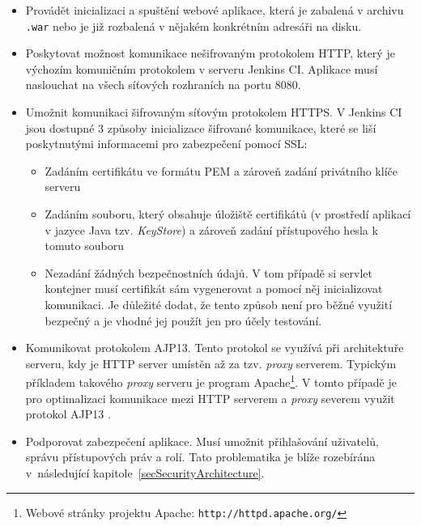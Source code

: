             \begin{itemize}
                \item Provádět inicializaci a spuštění webové aplikace, která je zabalená v archivu \texttt{.war}
                    nebo je již rozbalená v nějakém konkrétním adresáři na disku.
                
                \item Poskytovat možnost komunikace nešifrovaným protokolem HTTP, který je výchozím
                    komuničním protokolem v serveru Jenkins CI.  Aplikace musí naslouchat na všech síťových rozhraních na portu 8080.
                
                \item Umožnit komunikaci šifrovaným síťovým protokolem HTTPS. V Jenkins CI jsou dostupné 
                    3 způsoby inicializace šifrované komunikace, které se liší poskytnutými informacemi pro 
                    zabezpečení pomocí SSL:
                    \begin{itemize}
                        \item Zadáním certifikátu ve formátu PEM a zároveň zadání privátního klíče serveru
                        \item Zadáním souboru, který obsahuje úložiště certifikátů (v prostředí aplikací v jazyce Java tzv. \emph{KeyStore}) a zároveň zadání 
                            přístupového hesla k tomuto souboru
                        \item Nezadání žádných bezpečnostních údajů. V tom případě si servlet kontejner musí certifikát sám
                            vygenerovat a pomocí něj inicializovat komunikaci. Je důležité dodat, že tento způsob
                            není pro běžné využití bezpečný a je vhodné jej použít jen pro účely testování.
                    \end{itemize} 

                \item Komunikovat protokolem AJP13. Tento protokol se využívá při architektuře serveru,
                    kdy je HTTP server umístěn až za tzv. \emph{proxy} serverem. Typickým příkladem takového
                    \emph{proxy} serveru je program Apache\footnote{Webové stránky projektu Apache: 
                    \texttt{http://httpd.apache.org/}}. V tomto případě je pro optimalizaci komunikace mezi HTTP serverem
                    a \emph{proxy} severem využit protokol AJP13 \cite{ajp13Web}.

                \item Podporovat zabezpečení aplikace. Musí umožnit přihlašování uživatelů, správu přístupových práv a rolí.
                    Tato problematika je blíže rozebírána v~následující kapitole~\ref{secSecurityArchitecture}.
                    

\end{itemize}
